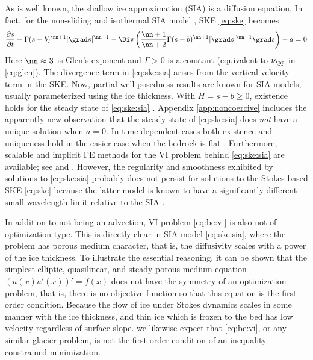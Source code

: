 As is well known, the shallow ice approximation (SIA) is a diffusion equation.  In fact, for the non-sliding and isothermal SIA model \cite{GreveBlatter2009,JouvetBueler2012}, SKE \eqref{eq:ske} becomes
\begin{equation}
\frac{\partial s}{\partial t} - \Gamma (s-b)^{\nn+1} |\grad s|^{\nn+1} - \Div \left(\frac{\nn+1}{\nn+2} \Gamma (s-b)^{\nn+1} |\grad s|^{\nn-1} \grad s\right) - a = 0  \label{eq:ske:sia}
\end{equation}
Here $\nn\approx 3$ is Glen's exponent \cite{GreveBlatter2009} and $\Gamma>0$ is a constant (equivalent to $\nu_\pp$ in \eqref{eq:glen}).  The divergence term in \eqref{eq:ske:sia} arises from the vertical velocity term in the SKE.  Now, partial well-posedness results are known for SIA models, usually parameterized using the ice thickness.  With $H=s-b \ge 0$, existence holds for the steady state of \eqref{eq:ske:sia} \cite{JouvetBueler2012}.  Appendix \ref{app:noncoercive} includes the apparently-new observation that the steady-state of \eqref{eq:ske:sia} does \emph{not} have a unique solution when $a=0$.  In time-dependent cases both existence and uniqueness hold in the easier case when the bedrock is flat \cite{Calvoetal2003,PiersantiTemam2023}.  Furthermore, scalable and implicit FE methods for the VI problem behind \eqref{eq:ske:sia} are available; see \cite{Bueler2016} and \cite[Example 8.4]{BuelerFarrell2024}.  However, the regularity and smoothness exhibited by solutions to \eqref{eq:ske:sia} probably does not persist for solutions to the Stokes-based SKE \eqref{eq:ske} because the latter model is known to have a significantly different small-wavelength limit relative to the SIA \cite{Pattynetal2008}.

In addition to not being an advection, VI problem \eqref{eq:be:vi} is also not of optimization type.  This is directly clear in SIA model \eqref{eq:ske:sia}, where the problem has porous medium character, that is, the diffusivity scales with a power of the ice thickness.  To illustrate the essential reasoning, it can be shown that the simplest elliptic, quasilinear, and steady porous medium equation $(u(x) u'(x))' = f(x)$ does not have the symmetry of an optimization problem, that is, there is no objective function so that this equation is the first-order condition.  Because the flow of ice under Stokes dynamics scales in some manner with the ice thickness, and thin ice which is frozen to the bed has low velocity regardless of surface slope. we likewise expect that  \eqref{eq:be:vi}, or any similar glacier problem, is not the first-order condition of an inequality-constrained minimization.
